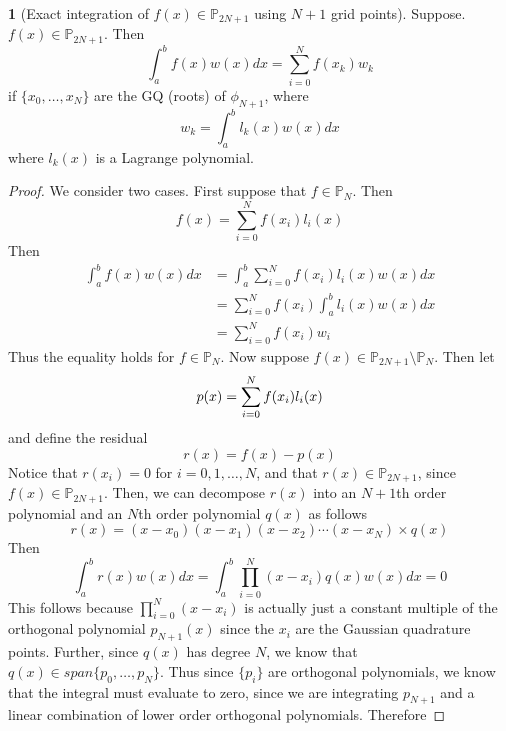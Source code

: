 \documentclass[12pt]{article}
\theoremstyle{definition}
\newtheorem{theorem}{\color{ForestGreen}{\textbf{Theorem}}}
\theoremstyle{definition}
\begin{document}
\begin{theorem}[Exact integration of $f(x) \in \mathbb{P}_{2N+1}$ using $N+1$ grid points]
	Suppose. $f(x) \in \mathbb{P}_{2N+1}$. Then 
	\begin{equation}
		\int_{a}^b f(x)w(x)dx = \sum_{i=0}^N f(x_k) w_k
	\end{equation}
	if $\{x_0, \ldots, x_N\}$ are the GQ (roots) of $\phi_{N+1}$, where
	\begin{equation}
		w_k = \int_a^b l_k(x)w(x)dx
	\end{equation}
	where $l_k(x)$ is a Lagrange polynomial. 
\end{theorem}
\begin{proof}
	We consider two cases. First suppose that $f \in \mathbb{P}_N$. Then
	\begin{equation}
		f(x) = \sum_{i=0}^N f(x_i)l_i(x)
	\end{equation}
	Then
	\begin{align*}
		\int_a^b f(x)w(x)dx &= \int_a^b \sum_{i=0}^N f(x_i)l_i(x) w(x) dx \\
		&= \sum_{i=0}^N f(x_i) \int_a^b l_i(x)w(x)dx \\
		&= \sum_{i=0}^N f(x_i) w_i
	\end{align*}
	Thus the equality holds for $f \in \mathbb{P}_N$. Now suppose $f(x) \in \mathbb{P}_{2N+1} \setminus \mathbb{P}_N$. Then let
	\begin{equation}
		p(x) = \sum_{i=0}^{N} f(x_i)l_i(x) \\
	\end{equation}
	and define the residual
	\begin{equation}
		r(x) = f(x) - p(x)
	\end{equation}
	Notice that $r(x_i) = 0$ for $i=0,1,\ldots,N$, and that $r(x) \in \mathbb{P}_{2N+1}$, since $f(x) \in \mathbb{P}_{2N+1}$. Then, we can decompose $r(x)$ into an $N+1$th order polynomial and an $N$th order polynomial $q(x)$ as follows
	\begin{equation}
		r(x) = (x-x_0)(x-x_1)(x-x_2)\cdots(x-x_N) \times q(x)
	\end{equation}
	Then
	\begin{equation}
		\int_a^b r(x)w(x)dx = \int_a^b \prod_{i=0}^N(x-x_i) q(x) w(x) dx = 0
 	\end{equation}
 	This follows because $\prod_{i=0}^N(x-x_i)$ is actually just a constant multiple of the orthogonal polynomial $p_{N+1}(x)$ since the $x_i$ are the Gaussian quadrature points. Further, since $q(x)$ has degree $N$, we know that $q(x) \in span\{p_0, \ldots, p_N\}$. Thus since $\{p_i\}$ are orthogonal polynomials, we know that the integral must evaluate to zero, since we are integrating $p_{N+1}$ and a linear combination of lower order orthogonal polynomials. Therefore

\end{proof}
\end{document}
